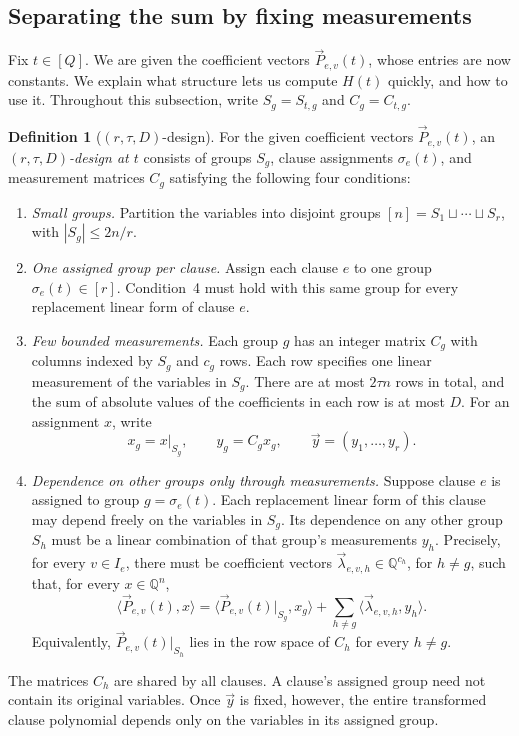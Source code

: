 \documentclass[11pt,reqno]{amsart}
\numberwithin{equation}{section}
\theoremstyle{definition}\newtheorem{definition}[theorem]{Definition}
\theoremstyle{remark}\newtheorem{remark}[theorem]{Remark}
\renewcommand{\le}{\leqslant}
\begin{document}
\subsection{Separating the sum by fixing measurements}
\label{subsec:preview-separation}
Fix $t\in[Q]$. We are given the coefficient vectors
$\vec{P}_{e,v}(t)$, whose entries are now constants. We explain
what structure lets us compute $H(t)$ quickly, and how to use it.
Throughout this subsection, write $S_g=S_{t,g}$ and $C_g=C_{t,g}$.

\begin{definition}[$(r,\tau,D)$-design]
\label{def:overview-measurement-structure}
For the given coefficient vectors $\vec{P}_{e,v}(t)$, an
\emph{$(r,\tau,D)$-design at $t$}
consists of groups $S_g$, clause assignments $\sigma_e(t)$,
and measurement matrices $C_g$ satisfying the following four
conditions:
\begin{enumerate}
\item \emph{Small groups.} Partition the variables into disjoint
groups $[n]=S_1\sqcup\cdots\sqcup S_r$, with $|S_g|\le2n/r$.
\item \emph{One assigned group per clause.} Assign each clause
$e$ to one group $\sigma_e(t)\in[r]$. Condition~4 must hold with
this same group for every replacement linear form of clause $e$.
\item \emph{Few bounded measurements.} Each group $g$ has an
integer matrix $C_g$ with columns indexed by $S_g$ and $c_g$ rows.
Each row specifies one linear measurement of the variables in
$S_g$. There are at most $2\tau n$ rows in total, and the sum of
absolute values of the coefficients in each row is at most $D$.
For an assignment $x$, write
\[
 x_g=x|_{S_g},\qquad y_g=C_gx_g,\qquad
 \vec{y}=(y_1,\ldots,y_r).
\]
\item \emph{Dependence on other groups only through measurements.}
Suppose clause $e$ is assigned to group $g=\sigma_e(t)$.
Each replacement linear form of this clause may depend freely on the
variables in $S_g$. Its dependence on any other group $S_h$ must
be a linear combination of that group's measurements $y_h$.
Precisely, for every $v\in I_e$, there must be coefficient vectors
$\vec{\lambda}_{e,v,h}\in\mathbb Q^{c_h}$, for $h\ne g$, such
that, for every $x\in\mathbb Q^n$,
\begin{equation}\label{eq:outline-separation}
 \langle\vec{P}_{e,v}(t),x\rangle
 =\langle\vec{P}_{e,v}(t)|_{S_g},x_g\rangle
   +\sum_{h\ne g}\langle\vec{\lambda}_{e,v,h},y_h\rangle.
\end{equation}
Equivalently, $\vec{P}_{e,v}(t)|_{S_h}$ lies in the row space
of $C_h$ for every $h\ne g$.
\end{enumerate}
\end{definition}
The matrices $C_h$ are shared by all clauses. A clause's assigned
group need not contain its original variables. Once $\vec{y}$
is fixed, however, the entire transformed clause polynomial
depends only on the variables in its assigned group.
\end{document}
